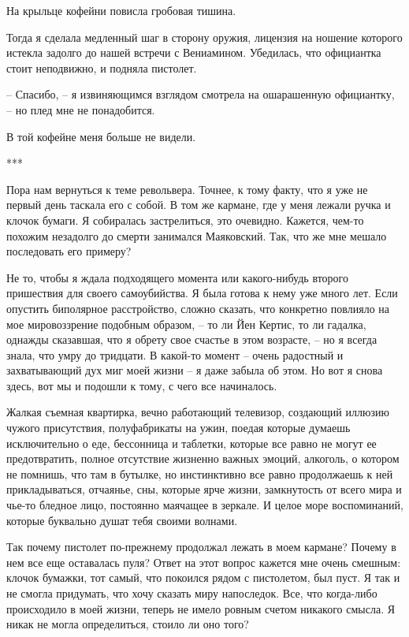 \documentclass[
]{book}
\begin{document}
На крыльце кофейни повисла гробовая тишина.

Тогда я сделала медленный шаг в сторону оружия, лицензия на ношение которого истекла задолго до нашей встречи с Вениамином. Убедилась, что официантка стоит неподвижно, и подняла пистолет.

-- Спасибо, -- я извиняющимся взглядом смотрела на ошарашенную официантку, -- но плед мне не понадобится.

В той кофейне меня больше не видели.

***

Пора нам вернуться к теме револьвера. Точнее, к тому факту, что я уже не первый день таскала его с собой. В том же кармане, где у меня лежали ручка и клочок бумаги. Я собиралась застрелиться, это очевидно. Кажется, чем-то похожим незадолго до смерти занимался Маяковский. Так, что же мне мешало последовать его примеру?

Не то, чтобы я ждала подходящего момента или какого-нибудь второго пришествия для своего самоубийства. Я была готова к нему уже много лет. Если опустить биполярное расстройство, сложно сказать, что конкретно повлияло на мое мировоззрение подобным образом, -- то ли Йен Кертис, то ли гадалка, однажды сказавшая, что я обрету свое счастье в этом возрасте, -- но я всегда знала, что умру до тридцати. В какой-то момент -- очень радостный и захватывающий дух миг моей жизни -- я даже забыла об этом. Но вот я снова здесь, вот мы и подошли к тому, с чего все начиналось.

Жалкая съемная квартирка, вечно работающий телевизор, создающий иллюзию чужого присутствия, полуфабрикаты на ужин, поедая которые думаешь исключительно о еде, бессонница и таблетки, которые все равно не могут ее предотвратить, полное отсутствие жизненно важных эмоций, алкоголь, о котором не помнишь, что там в бутылке, но инстинктивно все равно продолжаешь к ней прикладываться, отчаянье, сны, которые ярче жизни, замкнутость от всего мира и чье-то бледное лицо, постоянно маячащее в зеркале. И целое море воспоминаний, которые буквально душат тебя своими волнами.

Так почему пистолет по-прежнему продолжал лежать в моем кармане? Почему в нем все еще оставалась пуля? Ответ на этот вопрос кажется мне очень смешным: клочок бумажки, тот самый, что покоился рядом с пистолетом, был пуст. Я так и не смогла придумать, что хочу сказать миру напоследок. Все, что когда-либо происходило в моей жизни, теперь не имело ровным счетом никакого смысла. Я никак не могла определиться, стоило ли оно того?
\end{document}

